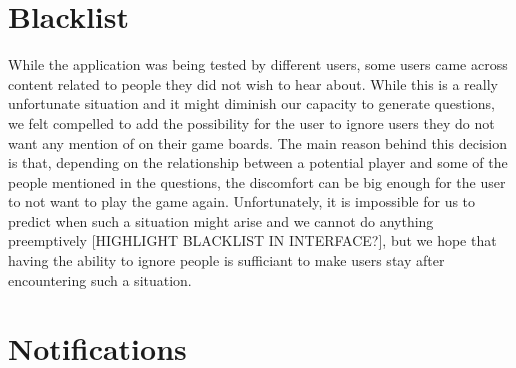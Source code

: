 \section{Blacklist}
While the application was being tested by different users, some users came across content related to people they did not wish to hear about. While this is a really unfortunate situation and it might diminish our capacity to generate questions, we felt compelled to add the possibility for the user to ignore users they do not want any mention of on their game boards. The main reason behind this decision is that, depending on the relationship between a potential player and some of the people mentioned in the questions, the discomfort can be big enough for the user to not want to play the game again. Unfortunately, it is impossible for us to predict when such a situation might arise and we cannot do anything preemptively [HIGHLIGHT BLACKLIST IN INTERFACE?], but we hope that having the ability to ignore people is sufficiant to make users stay after encountering such a situation.
\section{Notifications}